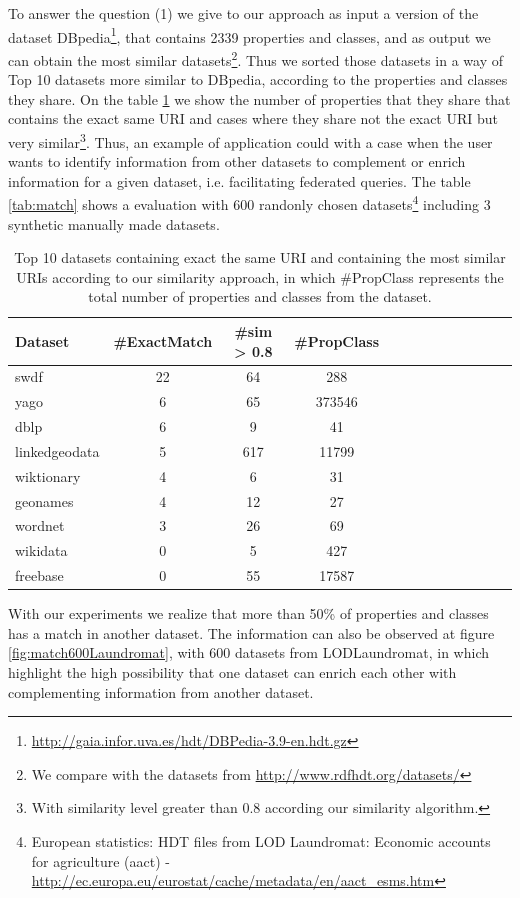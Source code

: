 To answer the question (1) we give to our approach as input a version of the dataset DBpedia\footnote{\url{http://gaia.infor.uva.es/hdt/DBPedia-3.9-en.hdt.gz}}, that contains 2339 properties and classes, and as output we can obtain the most similar datasets\footnote{We compare with the datasets from \url{http://www.rdfhdt.org/datasets/}}. Thus we sorted those datasets in a way of Top 10 datasets more similar to DBpedia, according to the properties and classes they share. On the table \ref{tab:top10} we show the number of properties that they share that contains the exact same URI and cases where they share not the exact URI but very similar\footnote{With similarity level greater than 0.8 according our similarity algorithm.}. Thus, an example of application could with a case when the user wants to identify information from other datasets to complement or enrich information for a given dataset, i.e. facilitating federated queries. The table \ref{tab:match} shows a evaluation with 600 randonly chosen datasets\footnote{European statistics: HDT files from LOD Laundromat: Economic accounts for agriculture (aact) - \url{http://ec.europa.eu/eurostat/cache/metadata/en/aact_esms.htm}} including 3 synthetic manually made datasets.

\begin{table}[htb]
\begin{tabular}{lcccccccccccc} \hline
\textbf{Dataset} & \textbf{\#ExactMatch} & \textbf{\#sim > 0.8} & \textbf{\#PropClas}s \\  \hline
swdf & 22 & 64 & 288 \\
yago & 6 & 65 & 373546 \\
dblp & 6 & 9 & 41 \\
linkedgeodata & 5 & 617 & 11799 \\
wiktionary & 4 & 6 & 31 \\
geonames & 4 & 12 & 27 \\
wordnet & 3 & 26 & 69 \\
wikidata & 0 & 5 & 427 \\
freebase & 0 & 55 & 17587 \\ \hline
\end{tabular}
\caption{Top 10 datasets containing exact the same URI and containing the most similar URIs according to our similarity approach, in which \#PropClass represents the total number of properties and classes from the dataset. }
\label{tab:top10}
\end{table}



With our experiments we realize that more than 50\% of properties and classes has a match in another dataset. The information can also be observed at figure \ref{fig:match600Laundromat}, with 600 datasets from LODLaundromat\cite{beek2014lod}, in which highlight the high possibility that one dataset can enrich each other with complementing information from another dataset.

